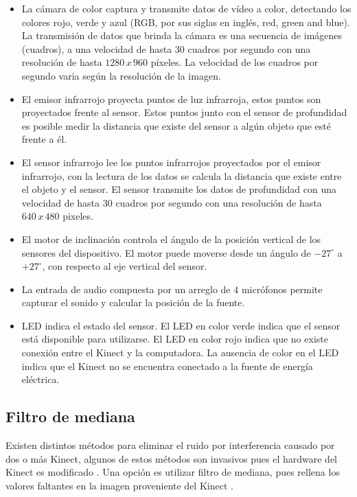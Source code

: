 \begin{itemize}
\item La cámara de color captura y transmite datos de vídeo a color, detectando los colores rojo, verde y azul (RGB, por sus siglas en ingl\'es, red, green and blue). La transmisión de datos que brinda la cámara es una secuencia de imágenes (cuadros), a una velocidad de hasta $30$ cuadros por segundo con una resolución de hasta $1280\, x \, 960$ p\'ixeles. La velocidad de los cuadros por segundo varia según la resolución de la imagen.

\item El emisor infrarrojo proyecta puntos de luz infrarroja, estos puntos son proyectados frente al sensor. Estos puntos junto con el sensor de profundidad es posible medir la distancia que existe del sensor a algún objeto que esté frente a él.  

\item El sensor infrarrojo lee los puntos infrarrojos proyectados por el emisor infrarrojo, con la lectura de los datos se calcula la distancia que existe entre el objeto y el sensor. El sensor transmite los datos de profundidad con una velocidad de hasta $30$ cuadros por segundo con una resolución de hasta $640 \, x \, 480$ pixeles.   

\item El motor de inclinación controla el \'angulo de la posición vertical de los sensores del dispositivo. El motor puede moverse desde un \'angulo de $-27^ \circ$ a $+27^\circ$, con respecto al eje vertical del sensor.  

\item La entrada de audio compuesta por un arreglo de  $4$ micrófonos permite capturar el sonido y calcular la posición de la fuente.

\item LED indica el estado del sensor. El LED en color verde indica que el sensor está disponible para utilizarse. El LED en color rojo indica que no existe conexión entre el Kinect y la computadora. La ausencia de color en el LED indica que el Kinect no se encuentra conectado a la fuente de energía eléctrica.
\end{itemize}

\subsection{Filtro de mediana} 

Existen distintos métodos para eliminar el ruido por interferencia causado por dos o más  Kinect, algunos de estos métodos son invasivos pues el hardware del Kinect es modificado \citep{Mallick2014}. Una opción es utilizar filtro de mediana, pues rellena los valores faltantes en la imagen proveniente del Kinect \citep{Maimone2011}. 

